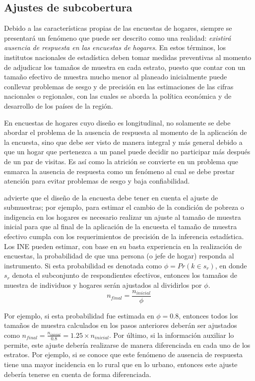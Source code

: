 \documentclass[
  10pt,
  spanish,
]{book}
\begin{document}
\hypertarget{ajustes-de-subcobertura}{%
\subsection{Ajustes de subcobertura}\label{ajustes-de-subcobertura}}

Debido a las características propias de las encuestas de hogares, siempre se presentará un fenómeno que puede ser descrito como una realidad: \emph{existirá ausencia de respuesta en las encuestas de hogares}. En estos términos, los institutos nacionales de estadística deben tomar medidas preventivas al momento de adjudicar los tamaños de muestra en cada estrato, puesto que contar con un tamaño efectivo de muestra mucho menor al planeado inicialmente puede conllevar problemas de sesgo y de precisión en las estimaciones de las cifras nacionales o regionales, con las cuales se aborda la política económica y de desarrollo de los países de la región.

En encuestas de hogares cuyo diseño es longitudinal, no solamente se debe abordar el problema de la ausencia de respuesta al momento de la aplicación de la encuesta, sino que debe ser visto de manera integral y más general debido a que un hogar que pertenezca a un panel puede decidir no participar más después de un par de visitas. Es así como la atrición se convierte en un problema que enmarca la ausencia de respuesta como un fenómeno al cual se debe prestar atención para evitar problemas de sesgo y baja confiabilidad.

\citet{Kalton_2009} advierte que el diseño de la encuesta debe tener en cuenta el ajuste de submuestras; por ejemplo, para estimar el cambio de la condición de pobreza o indigencia en los hogares es necesario realizar un ajuste al tamaño de muestra inicial para que al final de la aplicación de la encuesta el tamaño de muestra efectivo cumpla con los requerimientos de precisión de la inferencia estadística. Los INE pueden estimar, con base en su basta experiencia en la realización de encuestas, la probabilidad de que una persona (o jefe de hogar) responda al instrumento. Si esta probabilidad es denotada como \(\phi=Pr(k \in s_r)\), en donde \(s_r\) denota el subconjunto de respondientes efectivos, entonces los tamaños de muestra de individuos y hogares serán ajustados al dividirlos por \(\phi\).
\[n_{final} = \frac{n_{inicial}}{\phi}\]

Por ejemplo, si esta probabilidad fue estimada en \(\phi = 0.8\), entonces todos los tamaños de muestra calculados en los pasos anteriores deberán ser ajustados como \(n_{final} = \frac{n_{inicial}}{0.8} = 1.25\times n_{inicial}\). Por último, si la información auxiliar lo permite, este ajuste debería realizarse de manera diferenciada en cada uno de los estratos. Por ejemplo, si se conoce que este fenómeno de ausencia de respuesta tiene una mayor incidencia en lo rural que en lo urbano, entonces este ajuste debería tenerse en cuenta de forma diferenciada.
\end{document}
